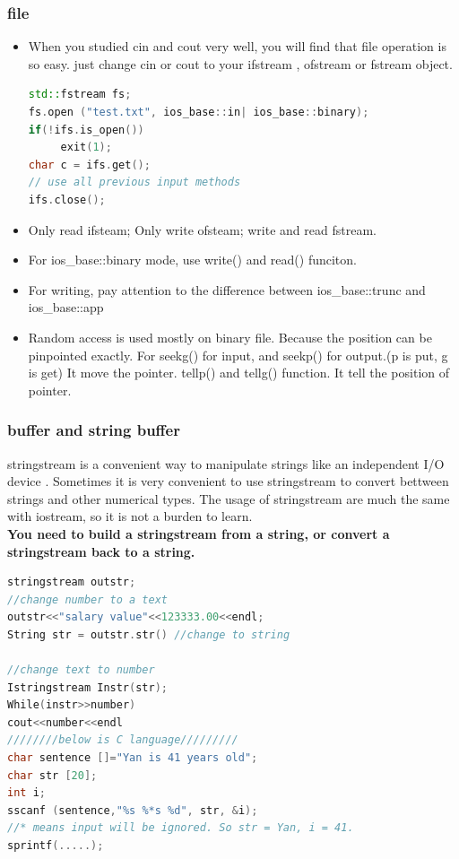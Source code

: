 \documentclass[a4paper,12pt,twoside]{book}
\begin{document}
\subsubsection{file}
\begin{itemize}
\item 	When you studied cin and cout very well, you will find that file operation is so easy. just change cin or cout to your ifstream , ofstream or fstream object.

\begin{lstlisting}[frame=single, language=c++]
std::fstream fs;
fs.open ("test.txt", ios_base::in| ios_base::binary);
if(!ifs.is_open())
     exit(1);
char c = ifs.get();
// use all previous input methods
ifs.close();
\end{lstlisting}


\item Only read ifsteam;  Only write ofsteam; write and read fstream.

\item For ios\_base::binary mode, use write() and read() funciton.

\item For writing, pay attention to the difference between ios\_base::trunc and ios\_base::app

\item Random access is used mostly on binary file. Because the position can be pinpointed exactly. For seekg() for input, and seekp() for output.(p is put, g is get) It move the pointer. tellp() and tellg() function.  It tell the position of pointer.

\end{itemize}

\subsubsection{buffer and string buffer}

stringstream is a convenient way to manipulate strings like an independent I/O device .
Sometimes it is very convenient to use stringstream to convert bettween strings and other numerical types. The usage of stringstream are much the same with iostream, so it is not a burden to learn.  \\

\textbf{You need to build a stringstream from a string, or convert a stringstream back to a string.}

\begin{lstlisting}[frame=single, language=c++]
stringstream outstr;
//change number to a text
outstr<<"salary value"<<123333.00<<endl;
String str = outstr.str() //change to string

//change text to number
Istringstream Instr(str);
While(instr>>number)
cout<<number<<endl
////////below is C language/////////
char sentence []="Yan is 41 years old";
char str [20];
int i;
sscanf (sentence,"%s %*s %d", str, &i);
//* means input will be ignored. So str = Yan, i = 41.
sprintf(.....);
\end{lstlisting}
\end{document}
